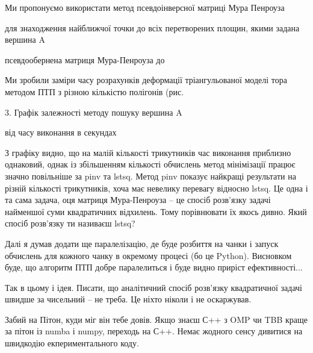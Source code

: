 \documentclass[12pt,a4paper]{article}
\begin{document}
Ми пропонуємо використати метод псевдоінверсної матриці Мура Пенроуза
\par
для знаходження найближчої точки до всіх перетворених площин, якими задана вершина A
\par
псевдообернена матриця Мура-Пенроуза до
\par
Ми зробили заміри часу розрахунків деформації тріангульованої моделі тора методом ПТП з різною кількістю полігонів (рис.
\par
3. Графік залежності методу пошуку вершина A
\par
від часу виконання в секундах
\par
З графіку видно, що на малій кількості трикутників час виконання приблизно однаковий, однак із збільшенням кількості обчислень метод мінімізації працює значно повільніше за pinv та lstsq. Метод pinv показує найкращі результати на різній кількості трикутників, хоча має невелику перевагу відносно lstsq. Це одна і та сама задача, оця матриця Мура-Пенроуза – це спосіб розв’язку задачі найменшої суми квадратичних відхилень. Тому порівнювати їх якось дивно. Який спосіб розв’язку ти називаєш lstsq?
\par
Далі я думав додати ще паралелізацію, де буде розбиття на чанки і запуск обчислень для кожного чанку в окремому процесі (бо це Python). Висновком буде, що алгоритм ПТП добре паралелиться і буде видно приріст ефективності...
\par
Так в цьому і ідея. Писати, що аналітичний спосіб розв’язку квадратичної задачі швидше за чисельний – не треба. Це ніхто ніколи і не оскаржував.
\par
Забий на Пітон, куди міг він тебе довів. Якщо знаєш С++ з OMP чи TBB краще за пітон із numba і numpy, переходь на С++. Немає жодного сенсу дивитися на швидкодію екпериментального коду.
\par
\end{document}
